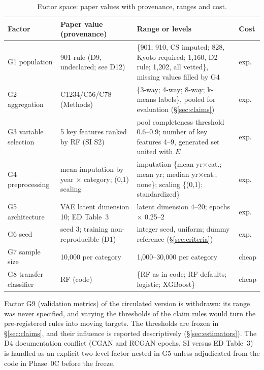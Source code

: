 \documentclass[11pt,a4paper]{article}
\newcommand{\prop}[1]{#1}
\newcommand{\prop}[1]{\textcolor{blue}{#1}}
\begin{document}
\begin{table}[H]
\caption{Factor space: paper values with provenance, ranges and cost.}
\label{tab:factors}
\footnotesize
\begin{tabularx}{\textwidth}{@{}l Y Y l@{}}
\toprule
Factor & Paper value (provenance) & Range or levels & Cost\\
\midrule
G1 population & \prop{901-rule (D9, undeclared; see D12)} &
  \prop{\{901; 910, CS imputed; 828, Kyoto required; 1{,}160, D2 rule;
  1{,}202, all vetted\}, missing values filled by G4} & exp.\\
G2 aggregation & C1234/C56/C78 (Methods) &
  \{3-way; 4-way; 8-way; k-means labels\}\prop{, pooled for evaluation
  (\S\ref{sec:claims})} & exp.\\
G3 variable selection & 5 key features ranked by RF (SI S2) &
  pool completeness threshold 0.6--0.9; number of key features 4--9\prop{,
  generated set united with $E$} & exp.\\
G4 preprocessing & mean imputation by year $\times$ category; (0,1)
  scaling & imputation \{mean yr$\times$cat.; mean yr; median
  yr$\times$cat.; none\}; scaling \{(0,1); standardized\} & exp.\\
G5 architecture & VAE latent dimension 10; ED Table~3 & latent dimension
  4--20; epochs $\times$ 0.25--2 & exp.\\
G6 seed & seed 3; training non-reproducible (D1) & \prop{integer seed,
  uniform; dummy reference (\S\ref{sec:criteria})} & exp.\\
G7 sample size & 10{,}000 per category & 1{,}000--30{,}000 per category &
  cheap\\
G8 transfer classifier & RF (code) & \{RF as in code; RF defaults;
  logistic; XGBoost\} & cheap\\
\bottomrule
\end{tabularx}
\end{table}

\noindent \prop{Factor G9 (validation metrics) of the circulated version is
withdrawn: its range was never specified, and varying the thresholds of
the claim rules would turn the pre-registered rules into moving targets.
The thresholds are frozen in \S\ref{sec:claims}, and their influence is
reported descriptively (\S\ref{sec:estimators}).} The D4 documentation
conflict (CGAN and RCGAN epochs, SI versus ED Table~3) is handled as an
explicit two-level factor nested in G5 unless adjudicated \prop{from the
code in Phase~0C} before the freeze.
\end{document}
